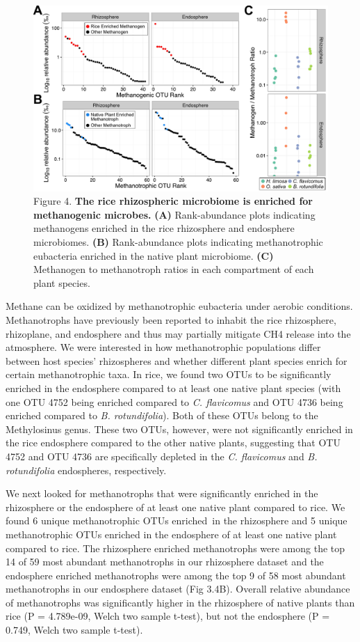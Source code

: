 \begin{figure}[h]
\centering
\includegraphics[width=5in]{Figures/figure2_4}
\caption[Figure 3.4]{Figure 4. \textbf{The rice rhizospheric microbiome is enriched for methanogenic microbes.} \textbf{(A)} Rank-abundance plots indicating methanogens enriched in the rice rhizosphere and endosphere microbiomes. \textbf{(B)} Rank-abundance plots indicating methanotrophic eubacteria enriched in the native plant microbiome. \textbf{(C)} Methanogen to methanotroph ratios in each compartment of each plant species.}
\label{Figure 3.4}
\end{figure}

Methane can be oxidized by methanotrophic eubacteria under aerobic conditions. Methanotrophs have previously been reported to inhabit the rice rhizosphere, rhizoplane, and endosphere and thus may partially mitigate CH4 release into the atmosphere. We were interested in how methanotrophic populations differ between host species' rhizospheres and whether different plant species enrich for certain methanotrophic taxa. In rice, we found two OTUs to be significantly enriched in the endosphere compared to at least one native plant species (with one OTU 4752 being enriched compared to \textit{C. flavicomus} and OTU 4736 being enriched compared to \textit{B. rotundifolia}). Both of these OTUs belong to the Methylosinus genus. These two OTUs, however, were not significantly enriched in the rice endosphere compared to the other native plants, suggesting that OTU 4752 and OTU 4736 are specifically depleted in the \textit{C. flavicomus} and \textit{B. rotundifolia} endospheres, respectively. 

We next looked for methanotrophs that were significantly enriched in the rhizosphere or the endosphere of at least one native plant compared to rice. We found 6 unique methanotrophic OTUs enriched in the rhizosphere and 5 unique methanotrophic OTUs enriched in the endosphere of at least one native plant compared to rice. The rhizosphere enriched methanotrophs were among the top 14 of 59 most abundant methanotrophs in our rhizosphere dataset and the endosphere enriched methanotrophs were among the top 9 of 58 most abundant methanotrophs in our endosphere dataset (Fig 3.4B). Overall relative abundance of methanotrophs was significantly higher in the rhizosphere of native plants than rice (P = 4.789e-09, Welch two sample t-test), but not the endosphere (P = 0.749, Welch two sample t-test).

